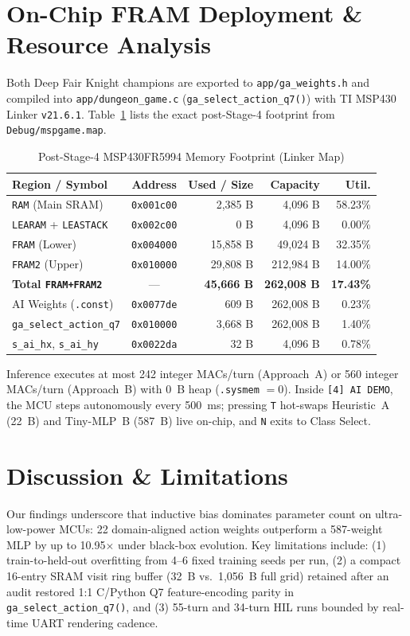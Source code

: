 \documentclass[conference]{IEEEtran}
\begin{document}
\section{On-Chip FRAM Deployment \& Resource Analysis}
Both Deep Fair Knight champions are exported to \texttt{app/ga\_weights.h} and compiled into \texttt{app/dungeon\_game.c} (\texttt{ga\_select\_action\_q7()}) with TI MSP430 Linker \texttt{v21.6.1}. Table~\ref{tab:mem} lists the exact post-Stage-4 footprint from \texttt{Debug/mspgame.map}.

\begin{table}[t]
\centering
\caption{Post-Stage-4 MSP430FR5994 Memory Footprint (Linker Map)}
\label{tab:mem}
\scriptsize
\begin{tabular}{@{}lcrrr@{}}
\toprule
Region / Symbol & Address & Used / Size & Capacity & Util. \\
\midrule
\texttt{RAM} (Main SRAM)         & \texttt{0x001c00} & 2,385 B & 4,096 B   & 58.23\% \\
\texttt{LEARAM} + \texttt{LEASTACK} & \texttt{0x002c00} & 0 B     & 4,096 B   &  0.00\% \\
\texttt{FRAM} (Lower)            & \texttt{0x004000} & 15,858 B & 49,024 B  & 32.35\% \\
\texttt{FRAM2} (Upper)           & \texttt{0x010000} & 29,808 B & 212,984 B & 14.00\% \\
\textbf{Total \texttt{FRAM+FRAM2}} & ---             & \textbf{45,666 B} & \textbf{262,008 B} & \textbf{17.43\%} \\
\midrule
AI Weights (\texttt{.const})     & \texttt{0x0077de} & 609 B   & 262,008 B &  0.23\% \\
\texttt{ga\_select\_action\_q7}  & \texttt{0x010000} & 3,668 B & 262,008 B &  1.40\% \\
\texttt{s\_ai\_hx}, \texttt{s\_ai\_hy} & \texttt{0x0022da} & 32 B    & 4,096 B   &  0.78\% \\
\bottomrule
\end{tabular}
\end{table}

Inference executes at most 242 integer MACs/turn (Approach~A) or 560 integer MACs/turn (Approach~B) with 0~B heap (\texttt{.sysmem} $= 0$). Inside \texttt{[4] AI DEMO}, the MCU steps autonomously every 500~ms; pressing \texttt{T} hot-swaps Heuristic~A (22~B) and Tiny-MLP~B (587~B) live on-chip, and \texttt{N} exits to Class Select.

\section{Discussion \& Limitations}
Our findings underscore that inductive bias dominates parameter count on ultra-low-power MCUs: 22 domain-aligned action weights outperform a 587-weight MLP by up to 10.95$\times$ under black-box evolution. Key limitations include: (1) train-to-held-out overfitting from 4--6 fixed training seeds per run, (2) a compact 16-entry SRAM visit ring buffer (32~B vs.\ 1,056~B full grid) retained after an audit restored 1:1 C/Python Q7 feature-encoding parity in \texttt{ga\_select\_action\_q7()}, and (3) 55-turn and 34-turn HIL runs bounded by real-time UART rendering cadence.
\end{document}
